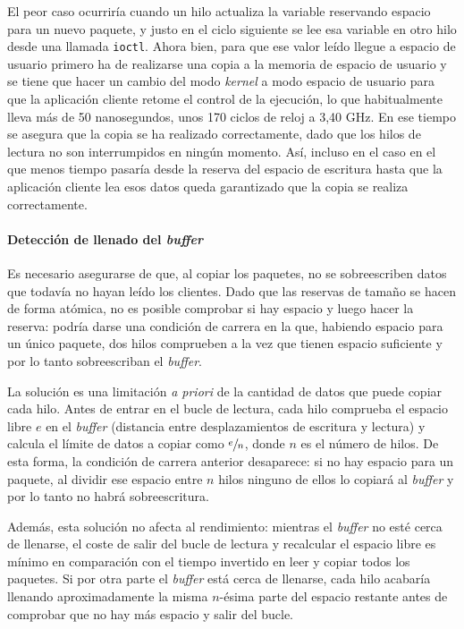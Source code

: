 \documentclass[oneside, draft]{epstfg}
\begin{document}
El peor caso ocurriría cuando un hilo actualiza la variable reservando espacio para un nuevo paquete, y justo en el ciclo siguiente se lee esa variable en otro hilo desde una llamada \texttt{ioctl}. Ahora bien, para que ese valor leído llegue a espacio de usuario primero ha de realizarse una copia a la memoria de espacio de usuario y se tiene que hacer un cambio del modo \textit{kernel} a modo espacio de usuario para que la aplicación cliente retome el control de la ejecución, lo que habitualmente lleva más de 50 nanosegundos, unos 170 ciclos de reloj a 3,40 GHz. En ese tiempo se asegura que la copia se ha realizado correctamente, dado que los hilos de lectura no son interrumpidos en ningún momento. Así, incluso en el caso en el que menos tiempo pasaría desde la reserva del espacio de escritura hasta que la aplicación cliente lea esos datos queda garantizado que la copia se realiza correctamente.

\paragraph{Detección de llenado del \textit{buffer}} Es necesario asegurarse de que, al copiar los paquetes, no se sobreescriben datos que todavía no hayan leído los clientes. Dado que las reservas de tamaño se hacen de forma atómica, no es posible comprobar si hay espacio y luego hacer la reserva: podría darse una condición de carrera en la que, habiendo espacio para un único paquete, dos hilos comprueben a la vez que tienen espacio suficiente y por lo tanto sobreescriban el \textit{buffer}.

La solución es una limitación \textit{a priori} de la cantidad de datos que puede copiar cada hilo. Antes de entrar en el bucle de lectura, cada hilo comprueba el espacio libre $e$ en el \textit{buffer} (distancia entre desplazamientos de escritura y lectura) y calcula el límite de datos a copiar como $\sfrac{e}{n}$, donde $n$ es el número de hilos. De esta forma, la condición de carrera anterior desaparece: si no hay espacio para un paquete, al dividir ese espacio entre $n$ hilos ninguno de ellos lo copiará al \textit{buffer} y por lo tanto no habrá sobreescritura.

Además, esta solución no afecta al rendimiento: mientras el \textit{buffer} no esté cerca de llenarse, el coste de salir del bucle de lectura y recalcular el espacio libre es mínimo en comparación con el tiempo invertido en leer y copiar todos los paquetes. Si por otra parte el \textit{buffer} está cerca de llenarse, cada hilo acabaría llenando aproximadamente la misma $n$-ésima parte del espacio restante antes de comprobar que no hay más espacio y salir del bucle.
\end{document}
